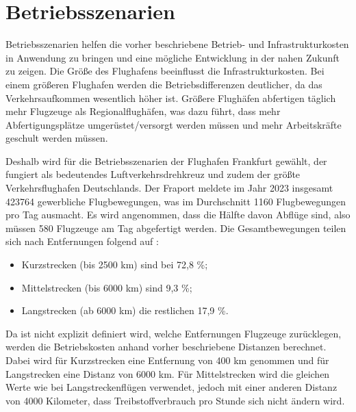 
\section{Betriebsszenarien}
\label{s:Betriebsszenarien}
Betriebsszenarien helfen die vorher beschriebene Betrieb- und Infrastrukturkosten in Anwendung zu bringen 
und eine mögliche Entwicklung in der nahen Zukunft zu zeigen. 
Die Größe des Flughafens beeinflusst die Infrastrukturkosten. 
Bei einem größeren Flughafen werden die Betriebsdifferenzen deutlicher, da das Verkehrsaufkommen wesentlich höher ist.
Größere Flughäfen abfertigen täglich mehr Flugzeuge als Regionalflughäfen, 
was dazu führt, dass mehr Abfertigungsplätze umgerüstet/versorgt werden müssen und mehr Arbeitskräfte geschult werden müssen.

Deshalb wird für die Betriebsszenarien der Flughafen Frankfurt gewählt, der fungiert als bedeutendes Luftverkehrsdrehkreuz
und zudem der größte Verkehrsflughafen Deutschlands.
Der Fraport meldete im Jahr 2023 insgesamt 423764 gewerbliche Flugbewegungen, was im Durchschnitt 1160 Flugbewegungen pro Tag ausmacht. 
Es wird angenommen, dass die Hälfte davon Abflüge sind, also müssen 580 Flugzeuge am Tag abgefertigt werden.
%
Die Gesamtbewegungen teilen sich nach Entfernungen folgend auf \cite{fraport2023frankfurt}:
\begin{itemize}
    \item Kurzstrecken (bis 2500 km) sind bei 72,8 \%;
    \item Mittelstrecken (bis 6000 km) sind 9,3 \%;
    \item Langstrecken (ab 6000 km) die restlichen 17,9 \%. 
    \end{itemize}
Da ist nicht explizit definiert wird, welche Entfernungen Flugzeuge zurücklegen, werden die Betriebskosten anhand vorher beschriebene Distanzen berechnet.
Dabei wird für Kurzstrecken eine Entfernung von 400 km genommen und für Langstrecken eine Distanz von 6000 km.
Für Mittelstrecken wird die gleichen Werte wie bei Langstreckenflügen verwendet, jedoch mit einer anderen Distanz von 4000 Kilometer,
dass Treibstoffverbrauch pro Stunde sich nicht ändern wird.

